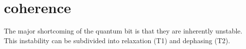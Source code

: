 \section{coherence}
The major shortcoming of the quantum bit is that they are inherently unstable.
This instability can be subdivided into relaxation (T1) and dephasing (T2).











